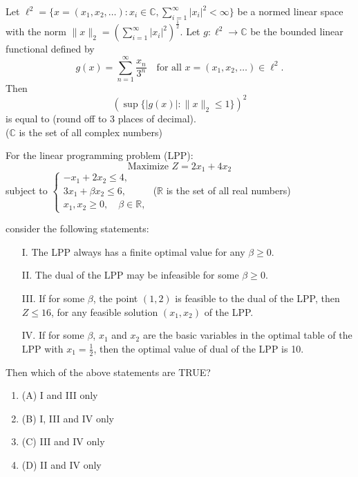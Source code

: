 \item Let
$
\ell^2 = \{ x = (x_1, x_2, \ldots) : x_i \in \mathbb{C}, \sum_{i=1}^{\infty} |x_i|^2 < \infty \}
$
be a normed linear space with the norm
$
\| x \|_2 = \left( \sum_{i=1}^{\infty} |x_i|^2 \right)^{\frac{1}{2}}.
$
Let $g : \ell^2 \to \mathbb{C}$ be the bounded linear functional defined by
\[
g(x) = \sum_{n=1}^{\infty} \frac{x_n}{3^n} \quad \text{for all } x = (x_1, x_2, \dots) \in \ell^2.
\]
Then
\[
\left( \sup \{ |g(x)| : \| x \|_2 \leq 1 \} \right)^2
\]
is equal to \underline{\hspace{1cm}} (round off to 3 places of decimal). \\
($\mathbb{C}$ is the set of all complex numbers)
\bigskip

\item For the linear programming problem (LPP):
\[
\text{Maximize } Z = 2x_1 + 4x_2
\]
subject to
$
\begin{cases}
-x_1 + 2x_2 \leq 4, \\
3x_1 + \beta x_2 \leq 6, \\
x_1, x_2 \geq 0, \quad \beta \in \mathbb{R},
\end{cases}
$
($\mathbb{R}$ is the set of all real numbers)

consider the following statements:
\begin{enumerate}
    \item[I.] The LPP always has a finite optimal value for any $\beta \geq 0$.
    \item[II.] The dual of the LPP may be infeasible for some $\beta \geq 0$.
    \item[III.] If for some $\beta$, the point $(1,2)$ is feasible to the dual of the LPP, then $Z \leq 16$, for any feasible solution $(x_1, x_2)$ of the LPP.
    \item[IV.] If for some $\beta$, $x_1$ and $x_2$ are the basic variables in the optimal table of the LPP with $x_1 = \frac{1}{2}$, then the optimal value of dual of the LPP is 10.
\end{enumerate}

Then which of the above statements are TRUE?

\begin{enumerate}
    \item (A) I and III only
    \item (B) I, III and IV only
    \item (C) III and IV only
    \item (D) II and IV only
\end{enumerate}
\bigskip

